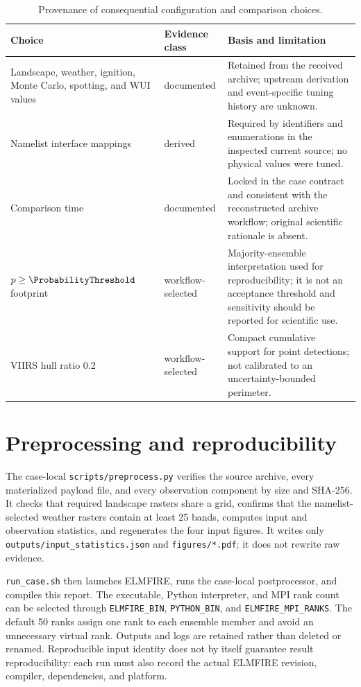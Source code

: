\begin{table}[H]
\centering
\begin{tabular}{@{}p{}p{}p{}@{}}
\toprule
Choice & Evidence class & Basis and limitation \\
\midrule
Landscape, weather, ignition, Monte Carlo, spotting, and WUI values & documented & Retained from the received archive; upstream derivation and event-specific tuning history are unknown. \\
Namelist interface mappings & derived & Required by identifiers and enumerations in the inspected current source; no physical values were tuned. \\
Comparison time & documented & Locked in the case contract and consistent with the reconstructed archive workflow; original scientific rationale is absent. \\
$p\geq\ProbabilityThreshold$ footprint & workflow-selected & Majority-ensemble interpretation used for reproducibility; it is not an acceptance threshold and sensitivity should be reported for scientific use. \\
VIIRS hull ratio 0.2 & workflow-selected & Compact cumulative support for point detections; not calibrated to an uncertainty-bounded perimeter. \\
\bottomrule
\end{tabular}
\caption{Provenance of consequential configuration and comparison choices.}
\end{table}

\section{Preprocessing and reproducibility}

The case-local \texttt{scripts/preprocess.py} verifies the source archive,
every materialized payload file, and every observation component by size and
SHA-256.  It checks that required landscape rasters share a grid, confirms that
the namelist-selected weather rasters contain at least 25 bands, computes input
and observation statistics, and regenerates the four input figures.  It writes
only \texttt{outputs/input\_statistics.json} and \texttt{figures/*.pdf}; it does
not rewrite raw evidence.

\texttt{run\_case.sh} then launches ELMFIRE, runs the case-local postprocessor,
and compiles this report.  The executable, Python interpreter, and MPI rank
count can be selected through \texttt{ELMFIRE\_BIN}, \texttt{PYTHON\_BIN}, and
\texttt{ELMFIRE\_MPI\_RANKS}.  The default 50 ranks assign one rank to each
ensemble member and avoid an unnecessary virtual rank.  Outputs and logs are
retained rather than deleted or renamed.  Reproducible input identity does not by itself guarantee result
reproducibility: each run must also record the actual ELMFIRE revision,
compiler, dependencies, and platform.

